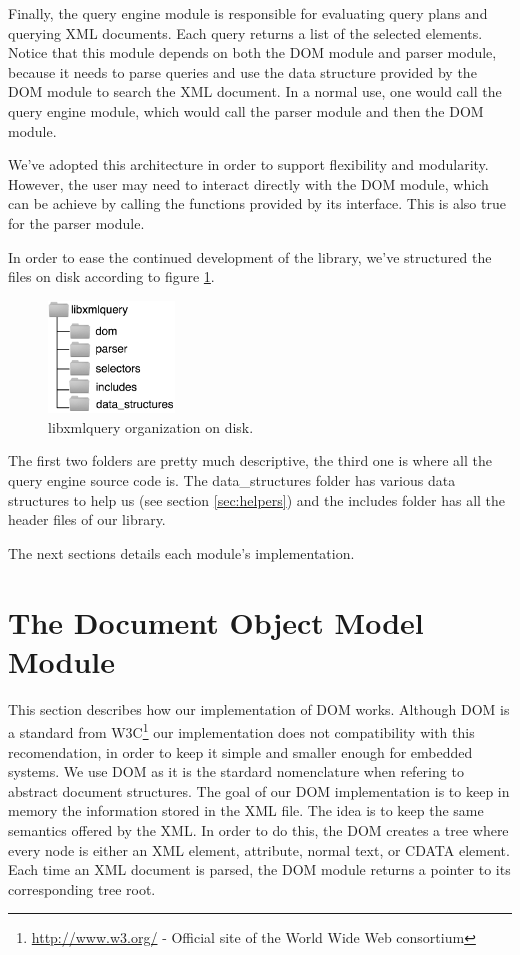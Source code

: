 \documentclass[a4paper]{report}
\begin{document}
	Finally, the query engine module is responsible for evaluating query plans and querying XML documents. Each query returns a list of the selected elements. Notice that this module depends on both the DOM module and parser module, because it needs to parse queries and use the data structure provided by the DOM module to search the XML document. In a normal use, one would call the query engine module, which would call the parser module and then the DOM module.

	We've adopted this architecture in order to support flexibility and modularity. However, the user may need to interact directly with the DOM module, which can be achieve by calling the functions provided by its interface. This is also true for the parser module.

	In order to ease the continued development of the library, we've structured the files on disk according to figure \ref{fig:disk}.

	 \begin{figure}[h!]
		\centering
		\label{fig:disk}
		\includegraphics[width=0.30\textwidth] {disk}
		\caption{libxmlquery organization on disk.}
	 \end{figure}

	The first two folders are pretty much descriptive, the third one is where all the query engine source code is. The data\_structures folder has various data structures to help us (see section \ref{sec:helpers}) and the includes
	folder has all the header files of our library.

	The next sections details each module's implementation.

\section{The Document Object Model Module}\label{sec:dom}
	This section describes how our implementation of DOM works. Although DOM is a standard from W3C\footnote{\url{http://www.w3.org/} - Official site of the World Wide Web consortium} our implementation does not compatibility with this recomendation, in order to keep it simple and smaller enough for embedded systems. We use DOM as it is the stardard nomenclature when refering to abstract document structures. The goal of our DOM implementation is to keep in memory the information stored in the XML file. The idea is to keep the same semantics offered by the
	XML. In order to do this, the DOM creates a tree where every node is either an XML element, attribute, normal text, or CDATA element. Each time an XML document is parsed, the DOM module returns a pointer to its corresponding	tree root.
\end{document}
